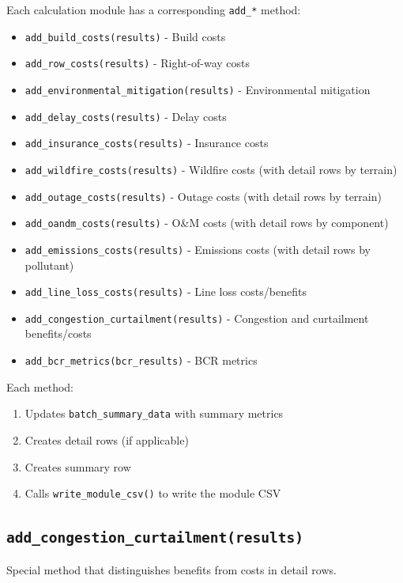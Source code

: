 \documentclass[ctcc_full_documentation.tex]{subfiles}
\begin{document}
Each calculation module has a corresponding \texttt{add\_*} method:

\begin{itemize}
    \item \texttt{add\_build\_costs(results)} - Build costs
    \item \texttt{add\_row\_costs(results)} - Right-of-way costs
    \item \texttt{add\_environmental\_mitigation(results)} - Environmental mitigation
    \item \texttt{add\_delay\_costs(results)} - Delay costs
    \item \texttt{add\_insurance\_costs(results)} - Insurance costs
    \item \texttt{add\_wildfire\_costs(results)} - Wildfire costs (with detail rows by terrain)
    \item \texttt{add\_outage\_costs(results)} - Outage costs (with detail rows by terrain)
    \item \texttt{add\_oandm\_costs(results)} - O\&M costs (with detail rows by component)
    \item \texttt{add\_emissions\_costs(results)} - Emissions costs (with detail rows by pollutant)
    \item \texttt{add\_line\_loss\_costs(results)} - Line loss costs/benefits
    \item \texttt{add\_congestion\_curtailment(results)} - Congestion and curtailment benefits/costs
    \item \texttt{add\_bcr\_metrics(bcr\_results)} - BCR metrics
\end{itemize}

Each method:
\begin{enumerate}
    \item Updates \texttt{batch\_summary\_data} with summary metrics
    \item Creates detail rows (if applicable)
    \item Creates summary row
    \item Calls \texttt{write\_module\_csv()} to write the module CSV
\end{enumerate}

\subsection{\texttt{add\_congestion\_curtailment(results)}}

Special method that distinguishes benefits from costs in detail rows.
\end{document}
